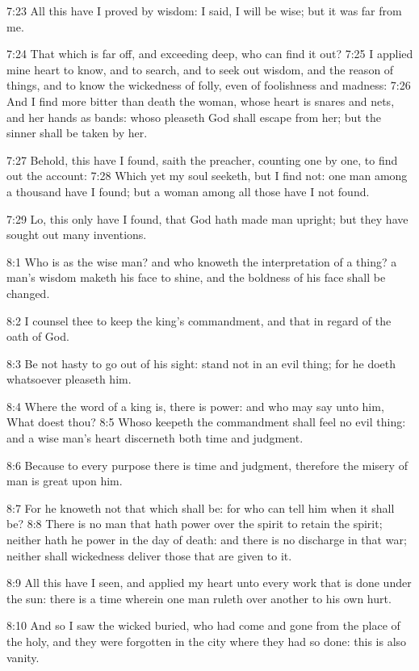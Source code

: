 7:23 All this have I proved by wisdom: I said, I will be wise; but it was far from me.

7:24 That which is far off, and exceeding deep, who can find it out?  7:25 I applied mine heart to know, and to search, and to seek out wisdom, and the reason of things, and to know the wickedness of folly, even of foolishness and madness: 7:26 And I find more bitter than death the woman, whose heart is snares and nets, and her hands as bands: whoso pleaseth God shall escape from her; but the sinner shall be taken by her.

7:27 Behold, this have I found, saith the preacher, counting one by one, to find out the account: 7:28 Which yet my soul seeketh, but I find not: one man among a thousand have I found; but a woman among all those have I not found.

7:29 Lo, this only have I found, that God hath made man upright; but they have sought out many inventions.

8:1 Who is as the wise man? and who knoweth the interpretation of a thing?  a man's wisdom maketh his face to shine, and the boldness of his face shall be changed.

8:2 I counsel thee to keep the king's commandment, and that in regard of the oath of God.

8:3 Be not hasty to go out of his sight: stand not in an evil thing; for he doeth whatsoever pleaseth him.

8:4 Where the word of a king is, there is power: and who may say unto him, What doest thou?  8:5 Whoso keepeth the commandment shall feel no evil thing: and a wise man's heart discerneth both time and judgment.

8:6 Because to every purpose there is time and judgment, therefore the misery of man is great upon him.

8:7 For he knoweth not that which shall be: for who can tell him when it shall be?  8:8 There is no man that hath power over the spirit to retain the spirit; neither hath he power in the day of death: and there is no discharge in that war; neither shall wickedness deliver those that are given to it.

8:9 All this have I seen, and applied my heart unto every work that is done under the sun: there is a time wherein one man ruleth over another to his own hurt.

8:10 And so I saw the wicked buried, who had come and gone from the place of the holy, and they were forgotten in the city where they had so done: this is also vanity.

